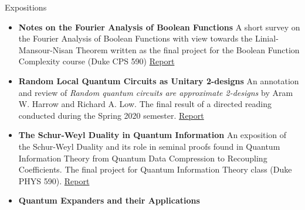 \documentclass{resume} %
\begin{document}
\begin{rSection}{Expositions}
  \begin{itemize}
    \item {\bf Notes on the Fourier Analysis of Boolean Functions} \hfill \newline
    A short survey on the Fourier Analysis of Boolean Functions with view towards the Linial-Mansour-Nisan Theorem written as the final project for the Boolean Function Complexity course (Duke CPS 590)
    \href{https://github.com/ekim1919/Research/blob/master/CS590/EdwardKimPaper.pdf}{Report}

    \item {\bf Random Local Quantum Circuits as Unitary 2-designs} \hfill \newline
     An annotation and review of \textit{Random quantum circuits are approximate 2-designs} by Aram W. Harrow and Richard A. Low. The final result of a directed reading conducted during the Spring 2020 semester.
    \href{https://github.com/ekim1919/Research/blob/master/PHYS790/final.pdf}{Report}

    \item {\bf The Schur-Weyl Duality in Quantum Information} \hfill \hfill \newline
    An exposition of the Schur-Weyl Duality and its role in seminal proofs found in Quantum Information Theory from Quantum Data Compression to Recoupling Coefficients. The final project for Quantum Information Theory class (Duke PHYS 590).
    \href{https://github.com/ekim1919/Research/blob/master/P590/final.pdf}{Report}

    \item {\bf Quantum Expanders and their Applications}

  \end{itemize}
\end{rSection}
\end{document}
